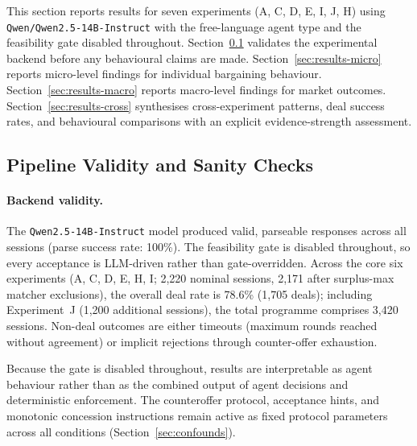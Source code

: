 
\label{sec:results}

This section reports results for seven experiments (A, C, D, E, I, J, H) using \texttt{Qwen/Qwen2.5-14B-Instruct} with the free-language agent type and the feasibility gate disabled throughout.  Section~\ref{sec:results-quality} validates the experimental backend before any behavioural claims are made.  Section~\ref{sec:results-micro} reports micro-level findings for individual bargaining behaviour.  Section~\ref{sec:results-macro} reports macro-level findings for market outcomes.  Section~\ref{sec:results-cross} synthesises cross-experiment patterns, deal success rates, and behavioural comparisons with an explicit evidence-strength assessment.


\subsection{Pipeline Validity and Sanity Checks}
\label{sec:results-quality}

\paragraph{Backend validity.}
The \texttt{Qwen2.5-14B-Instruct} model produced valid, parseable responses across all sessions (parse success rate: 100\%).  The feasibility gate is disabled throughout, so every acceptance is LLM-driven rather than gate-overridden.  Across the core six experiments (A, C, D, E, H, I; 2,220 nominal sessions, 2,171 after surplus-max matcher exclusions), the overall deal rate is 78.6\% (1,705 deals); including Experiment~J (1,200 additional sessions), the total programme comprises 3,420 sessions.  Non-deal outcomes are either timeouts (maximum rounds reached without agreement) or implicit rejections through counter-offer exhaustion.

Because the gate is disabled throughout, results are interpretable as agent behaviour rather than as the combined output of agent decisions and deterministic enforcement.  The counteroffer protocol, acceptance hints, and monotonic concession instructions remain active as fixed protocol parameters across all conditions (Section~\ref{sec:confounds}).

